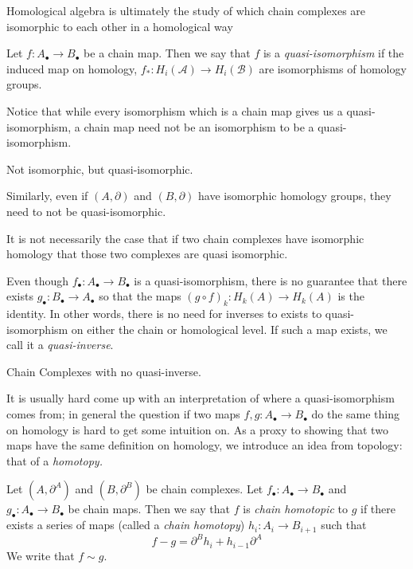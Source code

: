 
\begin{elevator}
Homological algebra is ultimately the study of which chain complexes are isomorphic to each other in a homological way
\end{elevator}
\label{append:chainhomotopy}
\begin{definition} \label{def:quasiisomorphism} Let $f:A_\bullet \to B_\bullet$ be a chain map. Then we say that $f$ is a  \emph{quasi-isomorphism} if the induced map on homology, $f_*:H_i(\mathcal A)\to H_i(\mathcal B)$ are isomorphisms of homology groups. \end{definition}
Notice that while every isomorphism which is a chain map gives us a quasi-isomorphism, a chain map need not be an isomorphism to be a quasi-isomorphism. 
\begin{example}
Not isomorphic, but quasi-isomorphic. 
\end{example}
Similarly, even if $(A, \partial)$ and $(B, \partial)$ have isomorphic homology groups, they need to not be quasi-isomorphic. 
\begin{example}
It is not necessarily the case that if two chain complexes have isomorphic homology that those two complexes are quasi isomorphic. 
\end{example}
Even though $f_\bullet: A_\bullet\to B_\bullet$ is a quasi-isomorphism, there is no guarantee that there exists $g_\bullet: B_\bullet\to A_\bullet$ so that the maps $(g\circ f)_k: H_k(A)\to H_k(A)$ is the identity. In other words, there is no need for inverses to exists to quasi-isomorphism on either the chain or homological level. If such a map exists, we call it a \emph{quasi-inverse}. 
\begin{example}
Chain Complexes with no quasi-inverse.
\end{example}
It is usually hard come up with an interpretation of where a quasi-isomorphism comes from; in general the question if two maps $f,g :A_\bullet\to B_\bullet$ do the same thing on homology is hard to get some intuition on. As a proxy to showing that two maps have the same definition on homology, we introduce an idea from topology: that of a \emph{homotopy.}

\begin{definition} Let $(A,\partial^A)$ and $(B, \partial^B)$ be chain complexes. Let $f_\bullet:A_\bullet\to B_\bullet$ and $g_\bullet:A_\bullet \to B_\bullet$ be chain maps. Then we say that $f$ is \emph{chain homotopic} to $g$ if there exists a series of maps (called a \emph{chain homotopy}) $h_i:A_i\to B_{i+1}$ such that $$f-g=\partial^B h_{i}+h_{i-1}\partial^A$$ We write that $f\sim g$. \end{definition}

